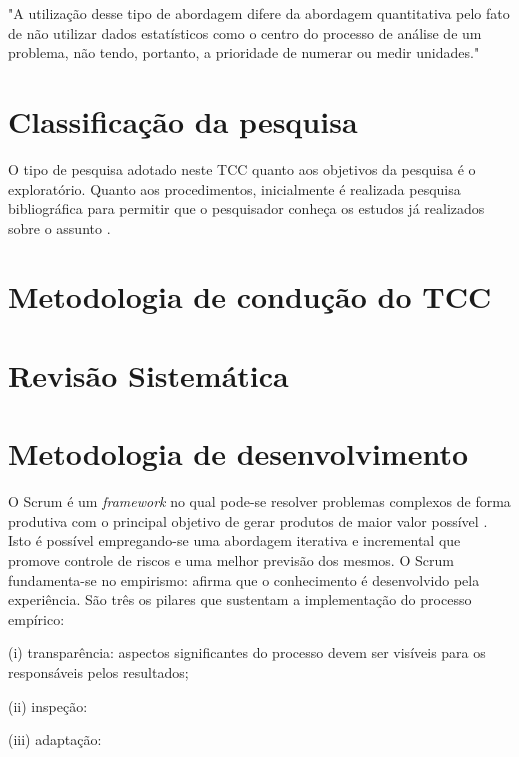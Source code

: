\begin{citacao}
"A utilização desse tipo de abordagem difere da abordagem quantitativa pelo fato de não utilizar dados estatísticos como o centro do processo de análise de um problema, não tendo, portanto, a prioridade de numerar ou medir unidades." \cite{prodanov2013} 
\end{citacao}

\section{Classificação da pesquisa}


O tipo de pesquisa adotado neste TCC  quanto aos objetivos da pesquisa é o exploratório. Quanto aos procedimentos, inicialmente é realizada pesquisa bibliográfica para permitir que o pesquisador conheça os estudos já realizados sobre o assunto \cite[pág. 31]{fonseca}. 






\section{Metodologia de condução do TCC}

\section{Revisão Sistemática}

\section{Metodologia de desenvolvimento}

O Scrum é um \textit{framework} no qual pode-se resolver problemas complexos de forma produtiva com o principal objetivo de gerar produtos de maior valor possível \cite{schwaber2016}. Isto é possível empregando-se uma abordagem iterativa e incremental que promove controle de riscos e uma melhor previsão dos mesmos. O Scrum fundamenta-se no empirismo: afirma que o conhecimento é desenvolvido pela experiência. São três os pilares que sustentam a implementação do processo empírico:

\par (i) transparência: aspectos significantes do processo devem ser visíveis para os responsáveis pelos resultados;
\par (ii) inspeção:
\par (iii) adaptação:

